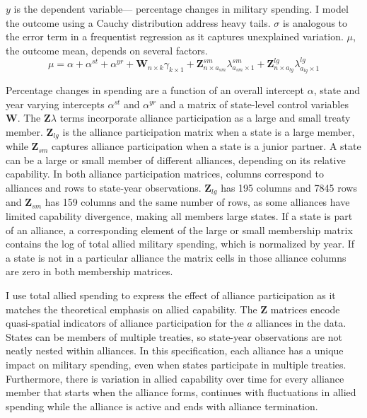 \documentclass[12pt]{article}
\begin{document}
$y$ is the dependent variable--- percentage changes in military spending. 
I model the outcome using a Cauchy distribution address heavy tails.
$\sigma$ is analogous to the error term in a frequentist regression as it captures unexplained variation.  
$\mu$, the outcome mean, depends on several factors.
\begin{equation}
\mu = \alpha + \alpha^{st} + \alpha^{yr} +\textbf{W}_{n \times k} \gamma_{k \times 1} + \textbf{Z}^{sm}_{n \times a_{sm}} \lambda^{sm}_{a_{sm} \times 1} + \textbf{Z}^{lg}_{n \times a_{lg}} \lambda^{lg}_{a_{lg} \times 1} 
\end{equation}


Percentage changes in spending are a function of an overall intercept $\alpha$, state and year varying intercepts $\alpha^{st}$ and $\alpha^{yr}$ and a matrix of state-level control variables $\textbf{W}$.
The $\textbf{Z} \lambda$ terms incorporate alliance participation as a large and small treaty member. 
$\textbf{Z}_{lg}$ is the alliance participation matrix when a state is a large member, while $\textbf{Z}_{sm}$ captures alliance participation when a state is a junior partner. 
A state can be a large or small member of different alliances, depending on its relative capability. 
In both alliance participation matrices, columns correspond to alliances and rows to state-year observations. 
$\textbf{Z}_{lg}$ has 195 columns and 7845 rows and $\textbf{Z}_{sm}$ has 159 columns and the same number of rows, as some alliances have limited capability divergence, making all members large states. 
If a state is part of an alliance, a corresponding element of the large or small membership matrix contains the log of total allied military spending, which is normalized by year.
If a state is not in a particular alliance the matrix cells in those alliance columns are zero in both membership matrices.


I use total allied spending to express the effect of alliance participation as it matches the theoretical emphasis on allied capability. 
The $\textbf{Z}$ matrices encode quasi-spatial indicators of alliance participation for the $a$ alliances in the data. 
States can be members of multiple treaties, so state-year observations are not neatly nested within alliances. 
In this specification, each alliance has a unique impact on military spending, even when states participate in multiple treaties. 
Furthermore, there is variation in allied capability over time for every alliance member that starts when the alliance forms, continues with fluctuations in allied spending while the alliance is active and ends with alliance termination. 
\end{document}

